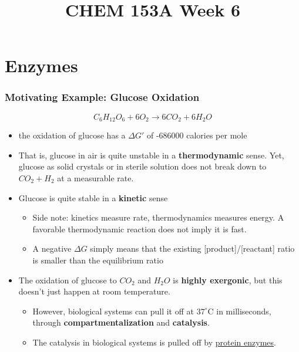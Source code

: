 \documentclass[10pt]{article}
\title{CHEM 153A Week 6}
\begin{document}
\maketitle
\section*{Enzymes}
\subsubsection*{Motivating Example: Glucose Oxidation}
\[C_6H_{12}O_6 + 6O_2 \rightarrow 6CO_2 + 6H_2O\]
\begin{itemize}
    \item the oxidation of glucose has a $\Delta G'$ of -686000 calories per mole
    \item That is, glucose in air is quite unstable in a \textbf{thermodynamic} sense.  Yet, glucose as solid crystals or in sterile solution does not break down to $CO_2 + H_2$ at a measurable rate.  
    \item Glucose is quite stable in a \textbf{kinetic} sense
    \begin{itemize}
        \item Side note: kinetics measure rate, thermodynamics measures energy.  A favorable thermodynamic reaction does not imply it is fast.
        \item A negative $\Delta G$ simply means that the existing [product]/[reactant] ratio is smaller than the equilibrium ratio
    \end{itemize}
    \item The oxidation of glucose to $CO_2$ and $H_2O$ is \textbf{highly exergonic}, but this doesn't just happen at room temperature.
    \begin{itemize}
        \item However, biological systems can pull it off at $37^\circ$C in milliseconds, through \textbf{compartmentalization} and \textbf{catalysis}.
        \item The catalysis in biological systems is pulled off by \underline{protein enzymes}.
    \end{itemize}
\end{itemize}
\end{document}
